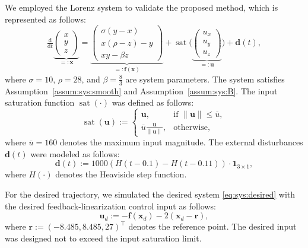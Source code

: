 \documentclass{ifacconf}
\newcommand*{\mv}[1]{\boldsymbol{#1}} %
\newcommand*{\norm}[1]{\left\lVert #1 \right\rVert} %
\DeclareMathOperator{\mysat}{{sat}}       %
\newcommand\der{\mathrm d}
\newcommand*{\ddtt}{
   \tfrac{\der}{\der t}
}
\begin{document}
We employed the Lorenz system to validate the proposed method, which is represented as follows:
\begin{equation}
   \ddtt
   \underbrace{
      \begin{pmatrix}
         x\\y\\z
      \end{pmatrix}
   }_{=:\mv{x}}
   =
   \underbrace{
      \begin{pmatrix}
         \sigma(y-x)
         \\
         x(\rho-z)-y
         \\
         xy-\beta z
      \end{pmatrix}
   }_{=:\mv{f}(\mv{x})}
   +
   \mysat
   \bigg(
      \underbrace{
         \begin{pmatrix}
            u_x\\u_y\\u_z
         \end{pmatrix}
      }_{=:\mv{u}}
   \bigg)
   +
   \mv{d}(t)
   ,
\end{equation}
where $\sigma=10$, $\rho=28$, and $\beta=\tfrac{8}{3}$ are system parameters.
The system satisfies Assumption~\ref{assum:sys:smooth} and Assumption~\ref{assum:sys:B}.
The input saturation function $\mysat(\cdot)$ was defined as follows:
\begin{equation}
   \mysat(\mv{u})
   :=
   \begin{cases}
      \mv{u}
      ,
      & \text{if } \norm{\mv{u}} \le \overline{u}
      ,
      \\
      \overline{u} \tfrac{\mv{u}}{\norm{\mv{u}}}
      ,
      & \text{otherwise}
      ,
   \end{cases}
\end{equation}
where $\overline{u}=160$ denotes the maximum input magnitude.
The external disturbances $\mv{d}(t)$ were modeled as follows:
\begin{equation}
   \mv{d}(t)
   :=
   1000 (H(t-0.1)-H(t-0.11))
   \cdot
   \mv{1}_{3\times1}
   ,
\end{equation}
where $H(\cdot)$ denotes the Heaviside step function.

For the desired trajectory, we simulated the desired system \eqref{eq:sys:desired} with the desired feedback-linearization control input as follows:
\begin{equation}
   \mv{u}_d
   :=
   -\mv{f}(\mv{x}_d) - 2(\mv{x}_d - \mv{r})
   ,
\end{equation}
where $\mv{r}:=(-8.485,8.485,27)^\top$ denotes the reference point.
The desired input was designed not to exceed the input saturation limit.
\end{document}

